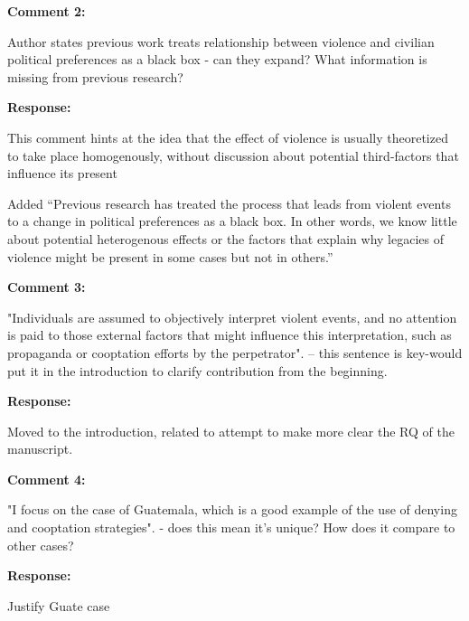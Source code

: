 \documentclass[12pt, a4paper, notitlepage]{article}
\begin{document}
\vspace{15pt}
\noindent\textbf{Comment 2:}
\begin{displayquote}
Author states previous work treats relationship between violence and civilian political preferences as a black box - can they expand? What information is missing from previous research?
\end{displayquote}

\noindent\textbf{Response:}

This comment hints at the idea that the effect of violence is usually theoretized to take place homogenously, without discussion about potential third-factors that influence its present

Added ``Previous research has treated the process that leads from violent events to a change in political preferences as a black box.
In other words, we know little about potential heterogenous effects or the factors that explain why legacies of violence might be present in some cases but not in others.''


\vspace{15pt}
\noindent\textbf{Comment 3:}
\begin{displayquote}
"Individuals are assumed to objectively interpret violent events, and no attention is paid to those external factors that might influence this interpretation, such as propaganda or cooptation efforts by the perpetrator". -- this sentence is key-would put it in the introduction to clarify contribution from the beginning.
\end{displayquote}

\noindent\textbf{Response:}

Moved to the introduction, related to attempt to make more clear the RQ of the manuscript.

\vspace{15pt}
\noindent\textbf{Comment 4:}
\begin{displayquote}
"I focus on the case of Guatemala, which is a good example of the use of denying and cooptation strategies". - does this mean it's unique? How does it compare to other cases?
\end{displayquote}

\noindent\textbf{Response:}

Justify Guate case
\end{document}
